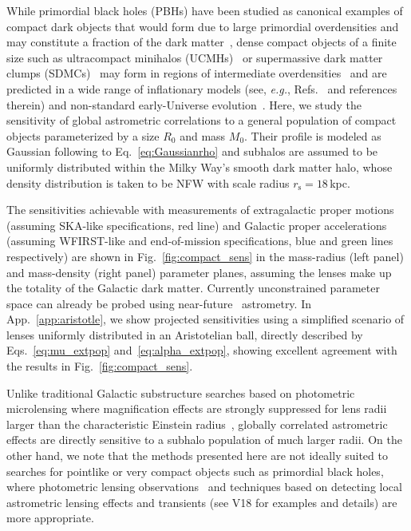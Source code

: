 \documentclass[prd,aps,twocolumn,nofootinbib,superscriptaddress,preprintnumbers,balancelastpage,longbibliography,floatfix]{revtex4-1}
\begin{document}
While primordial black holes (PBHs) have been studied as canonical examples of compact dark objects that would form due to large primordial overdensities and may constitute a fraction of the dark matter~\cite{Carr:1975qj, Niemeyer:1999ak}, dense compact objects of a finite size such as ultracompact minihalos (UCMHs)~\cite{Delos:2017thv,Delos:2018ueo} or supermassive dark matter clumps (SDMCs)~\cite{Berezinsky:2013fxa} may form in regions of intermediate overdensities~\cite{Ricotti:2009bs,Bringmann:2011ut} and are predicted in a wide range of inflationary models (see, \emph{e.g.}, Refs.~\cite{Chluba:2012we,Aslanyan:2015hmi,Delos:2017thv} and references therein) and non-standard early-Universe evolution~\cite{Schmid:1998mx,Erickcek:2011us}. Here, we study the sensitivity of global astrometric correlations to a general population of compact objects parameterized by a size $R_0$ and mass $M_0$. Their profile is modeled as Gaussian following to Eq.~\eqref{eq:Gaussianrho} and subhalos are assumed to be uniformly distributed within the Milky Way's smooth dark matter halo, whose density distribution is taken to be NFW with scale radius $r_\mathrm{s} = 18$\,kpc.

The sensitivities achievable with measurements of extragalactic proper motions (assuming SKA-like specifications, red line) and Galactic proper accelerations (assuming WFIRST-like and end-of-mission \Gaia specifications, blue and green lines respectively) are shown in Fig.~\ref{fig:compact_sens} in the mass-radius (left panel) and mass-density (right panel) parameter planes, assuming the lenses make up the totality of the Galactic dark matter. Currently unconstrained parameter space can already be probed using near-future \Gaia~astrometry. In App.~\ref{app:aristotle}, we show projected sensitivities using a simplified scenario of lenses uniformly distributed in an Aristotelian ball, directly described by Eqs.~\eqref{eq:mu_extpop} and~\eqref{eq:alpha_extpop}, showing excellent agreement with the results in Fig.~\ref{fig:compact_sens}.

Unlike traditional Galactic substructure searches based on photometric microlensing where magnification effects are strongly suppressed for lens radii larger than the characteristic Einstein radius~\cite{Paczynski:1985jf,Croon:2020wpr}, globally correlated astrometric effects are directly sensitive to a subhalo population of much larger radii. On the other hand, we note that the methods presented here are not ideally suited to searches for pointlike or very compact objects such as primordial black holes, where photometric lensing observations~\cite{Croon:2020wpr} and techniques based on detecting local astrometric lensing effects and transients (see V18 for examples and details) are more appropriate.
\end{document}
